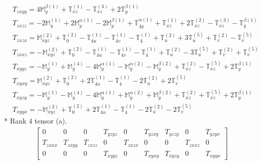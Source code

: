 \documentclass[fleqn,8pt,landscape]{jsarticle}
\begin{document}
\begin{align*}
& T_{zxyy} = 4 \mathbb{M}_{y}^{\beta(1)} + \mathbb{T}_{xz}^{(1)} - \mathbb{T}_{xz}^{(3)} + 2 \mathbb{T}_{y}^{\beta(1)} \\
& T_{zxzz} = - 2 \mathbb{M}_{y}^{(1)} + 2 \mathbb{M}_{y}^{\alpha(1)} - 2 \mathbb{M}_{y}^{\beta(1)} + \mathbb{T}_{4y}^{\alpha(1)} + \mathbb{T}_{xz}^{(1)} + 2 \mathbb{T}_{xz}^{(2)} - \mathbb{T}_{xz}^{(3)} - \mathbb{T}_{y}^{\beta(1)} \\
& T_{zxzx} = \mathbb{M}_{xyz}^{(2)} + \mathbb{T}_{0}^{(2)} - \mathbb{T}_{4u}^{(1)} - \mathbb{T}_{4v}^{(1)} - \mathbb{T}_{4}^{(1)} + \mathbb{T}_{u}^{(2)} + 3 \mathbb{T}_{u}^{(5)} + \mathbb{T}_{v}^{(2)} - \mathbb{T}_{v}^{(5)} \\
& T_{zxxz} = - \mathbb{M}_{xyz}^{(2)} + \mathbb{T}_{0}^{(2)} - \mathbb{T}_{4u}^{(1)} - \mathbb{T}_{4v}^{(1)} - \mathbb{T}_{4}^{(1)} + \mathbb{T}_{u}^{(2)} - 3 \mathbb{T}_{u}^{(5)} + \mathbb{T}_{v}^{(2)} + \mathbb{T}_{v}^{(5)} \\
& T_{xyyz} = - \mathbb{M}_{y}^{(1)} + \mathbb{M}_{y}^{(4)} - 4 \mathbb{M}_{y}^{\alpha(1)} - \mathbb{M}_{y}^{\alpha(2)} - \mathbb{M}_{y}^{\beta(2)} + \mathbb{T}_{xz}^{(2)} - \mathbb{T}_{xz}^{(5)} + 2 \mathbb{T}_{y}^{\beta(1)} \\
& T_{xyxy} = \mathbb{M}_{xyz}^{(2)} + \mathbb{T}_{0}^{(2)} + 2 \mathbb{T}_{4u}^{(1)} - \mathbb{T}_{4}^{(1)} - 2 \mathbb{T}_{u}^{(2)} + 2 \mathbb{T}_{v}^{(5)} \\
& T_{xyzy} = - \mathbb{M}_{y}^{(1)} - \mathbb{M}_{y}^{(4)} - 4 \mathbb{M}_{y}^{\alpha(1)} + \mathbb{M}_{y}^{\alpha(2)} + \mathbb{M}_{y}^{\beta(2)} + \mathbb{T}_{xz}^{(2)} + \mathbb{T}_{xz}^{(5)} + 2 \mathbb{T}_{y}^{\beta(1)} \\
& T_{xyyx} = - \mathbb{M}_{xyz}^{(2)} + \mathbb{T}_{0}^{(2)} + 2 \mathbb{T}_{4u}^{(1)} - \mathbb{T}_{4}^{(1)} - 2 \mathbb{T}_{u}^{(2)} - 2 \mathbb{T}_{v}^{(5)}
\end{align*}
* Rank 4 tensor (a).
\begin{align*}
\begin{bmatrix} 0 & 0 & 0 & T_{yzyz} & 0 & T_{yzxy} & T_{yzzy} & 0 & T_{yzyx} \\ T_{zxxx} & T_{zxyy} & T_{zxzz} & 0 & T_{zxzx} & 0 & 0 & T_{zxxz} & 0 \\ 0 & 0 & 0 & T_{xyyz} & 0 & T_{xyxy} & T_{xyzy} & 0 & T_{xyyx} \end{bmatrix}
\end{align*}
\end{document}
